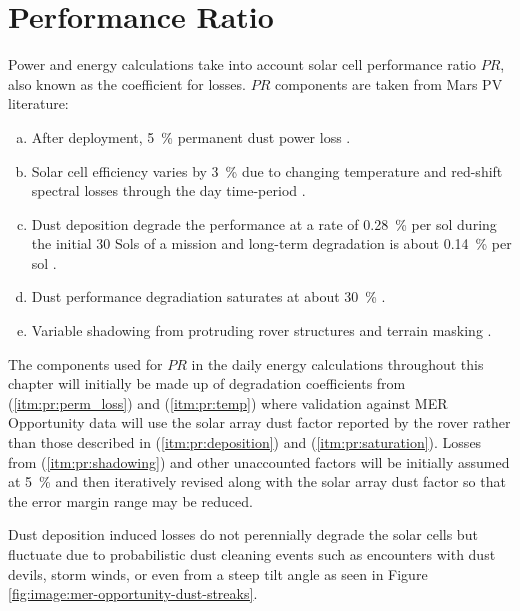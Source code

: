 \section{Performance Ratio}
\label{sec:PowerAndEnergyPredictions:PerformanceRatio}
Power and energy calculations take into account solar cell performance ratio $PR$, also known as the coefficient for losses. $PR$ components are taken from Mars PV literature:

\begin{enumerate}[(a)]
  \item\label{itm:pr:perm_loss}After deployment, \SI{5}{\percent} permanent dust power loss .
  \item\label{itm:pr:temp}Solar cell efficiency varies by \SI{3}{\percent} due to changing temperature and red-shift spectral losses through the day time-period .
  \item\label{itm:pr:deposition}Dust deposition degrade the performance at a rate of \SI{0.28}{\percent} per sol during the initial 30 Sols of a mission and long-term degradation is about \SI{0.14}{\percent} per sol .
  \item\label{itm:pr:saturation}Dust performance degradiation saturates at about \SI{30}{\percent} .
  \item\label{itm:pr:shadowing}Variable shadowing from protruding rover structures  and terrain masking .
\end{enumerate}

The components used for $PR$ in the daily energy calculations throughout this chapter will initially be made up of degradation coefficients from (\ref{itm:pr:perm_loss}) and
(\ref{itm:pr:temp}) where validation against MER Opportunity data will use the solar array dust factor reported by the rover rather than those described in (\ref{itm:pr:deposition}) and (\ref{itm:pr:saturation}). Losses from (\ref{itm:pr:shadowing}) and other unaccounted factors will be initially assumed at \SI{5}{\percent} and then iteratively revised along with the solar array dust factor so that the error margin range may be reduced.

Dust deposition induced losses do not perennially degrade the solar cells but fluctuate due to probabilistic dust cleaning events such as encounters with dust devils, storm winds, or even from a steep tilt angle as seen in Figure \ref{fig:image:mer-opportunity-dust-streaks}.

